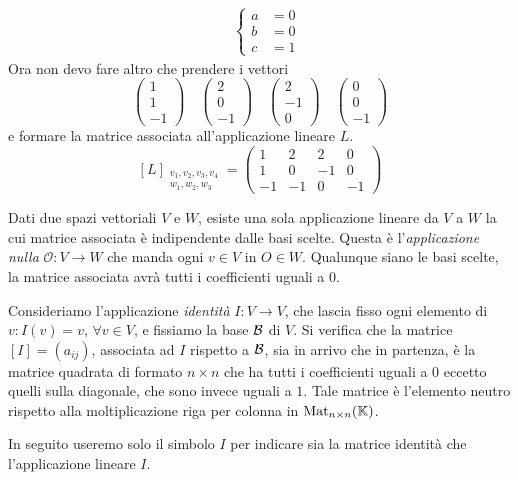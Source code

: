 \begin{example}
\begin{gather*}
		\quad
		\begin{cases}
			a & = 0 \\
			b & = 0 \\
			c & = 1
		\end{cases}
	\end{gather*}
	Ora non devo fare altro che prendere i vettori
	\[
		\begin{pmatrix}
			1 \\ 1 \\ -1
		\end{pmatrix}
		\quad
		\begin{pmatrix}
			2 \\ 0 \\ -1
		\end{pmatrix}
		\quad
		\begin{pmatrix}
			2 \\ -1 \\ 0
		\end{pmatrix}
		\quad
		\begin{pmatrix}
			0 \\ 0 \\ -1
		\end{pmatrix}
	\]
	e formare la matrice associata all'applicazione lineare $L$.
	\[
		[L]_{\substack{v_1, v_2, v_3, v_4 \\
					w_1, w_2, w_3}} =
		\begin{pmatrix}
			1  & 2  & 2  & 0  \\
			1  & 0  & -1 & 0  \\
			-1 & -1 & 0  & -1
		\end{pmatrix}
	\]
\end{example}

\begin{observation}
	Dati due spazi vettoriali $V$ e $W$, esiste una sola applicazione lineare da $V$ a $W$ la cui matrice
	associata è indipendente dalle basi scelte. Questa è l'\emph{applicazione nulla}
	$\mathcal{O} : V \rightarrow W$ che manda ogni $v \in V$ in $O \in W$. Qualunque siano le basi scelte, la
	matrice associata avrà tutti i coefficienti uguali a $0$.
\end{observation}

\begin{observation}
	Consideriamo l'applicazione \emph{identità} $I : V \rightarrow V$, che lascia fisso ogni elemento di
	$v: I(v) = v$, $\forall v \in V$, e fissiamo la base $\mathcal{B}$ di $V$. Si verifica che la matrice
	$[I] = (a_{ij})$, associata ad $I$ rispetto a $\mathcal{B}$, sia in arrivo che in partenza, è la matrice
	quadrata di formato $n \times n$ che ha tutti i coefficienti uguali a $0$ eccetto quelli sulla diagonale,
	che sono invece uguali a $1$.  Tale matrice è l'elemento neutro rispetto alla moltiplicazione riga per
	colonna in $\operatorname{Mat}_{n \times n}(\mathbb{K})$.

	In seguito useremo solo il simbolo $I$ per indicare sia la matrice identità che	l'applicazione lineare
	$I$.
\end{observation}